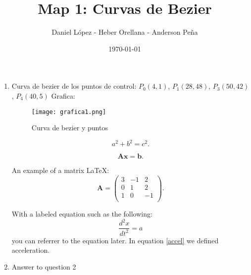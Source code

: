 \documentclass[11pt]{article}
\begin{document}
\author{Daniel López - Heber Orellana - Anderson Peña} \date{\today}
\title{Map 1: Curvas de Bezier}
\maketitle

\medskip

\begin{enumerate}

\item
Curva de bezier de los puntos de control: $P_0(4,1)$, $P_1(28,48)$, $P_3(50,42)$, $P_4(40,5)$
Grafica:
\begin{figure}
\texttt{[image: grafica1.png]}
\caption{Curva de bezier y puntos}
\label{fig: grafica1}
\end{figure}
\begin{equation}
    a^2 + b^2 = c^2.
\end{equation}


\begin{equation}
    \mathbf{A} \mathbf{x} = \mathbf{b}.
\end{equation}

An example of a matrix \LaTeX:
\begin{equation}
    \mathbf{A} = \left(
    \begin{array}{ccc}
    3 & -1 & 2 \\ 	
    0 & 1 & 2 \\ 
    1 & 0 & -1 \\
\end{array} 
\right).  
\end{equation}

With a labeled equation such as the following:
\begin{equation}
    \label{accel}
    \frac{d^2 x}{d t^2} = a
\end{equation}
you can referrer to the equation later. In equation \ref{accel} we defined acceleration.


\item
Answer to question 2


\end{enumerate}
\end{document}
